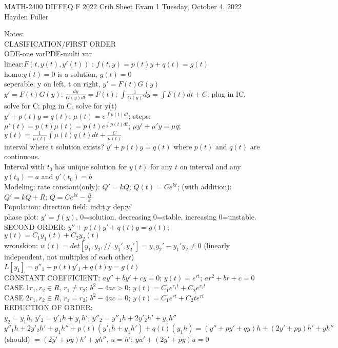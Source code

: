 \documentclass{article}
\begin{document}
MATH-2400 DIFFEQ F 2022 Crib Sheet Exam 1 Tuesday, October 4, 2022 Hayden Fuller
\begin{large}
\noindent Notes:
\\CLASIFICATION/FIRST ORDER
\\ODE-one var\qquad PDE-multi var
\\linear:$F(t,y(t),y'(t))$ : $f(t,y)=p(t)y+q(t)=g(t)$
\\homo:$y(t)=0$ is a solution,  $g(t)=0$
\\seperable: y on left, t on right, $y'=F(t)G(y)$
\\$y'=F(t)G(y)$; $\frac{dy}{G(y)dt}=F(t)$; $\int\frac{1}{G(y)}dy=\int F(t)dt+C$; plug in IC, solve for C; plug in C, solve for y(t)
\\$y'+p(t)y=q(t)$; $\mu(t)=e^{\int p(t)dt}$; steps:$\mu'(t)=p(t)\mu(t)=p(t)e^{\int p(t)dt}$; $\mu y'+\mu'y=\mu q$; 
\\$y(t)=\frac{1}{\mu(t)}\int\mu(t)q(t)dt+\frac{C}{\mu(t)}$
\\interval where t solution exists? $y'+p(t)y=q(t)$ where $p(t)$ and $q(t)$ are continuous. 
\\Interval with $t_0$ has unique solution for $y(t)$ for any $t$ on interval and any $y(t_0)=a$ and $y'(t_0)=b$
\\Modeling: rate constant(only): $Q'=kQ$; $Q(t)=Ce^{kt}$; (with addition): $Q'=kQ+R$; $Q=Ce^{kt}-\frac{R}{k}$
\\Population: direction field: ind:t,y dep:y'
\\phase plot: $y'=f(y)$, 0=solution, decreasing 0=stable, increasing 0=unstable.
\\SECOND ORDER: $y''+p(t)y'+q(t)y=g(t)$; $y(t)=C_1y_1(t)+C_2y_2(t)$
\\wronskion: $w(t)=det[y_1,y_2,//,y_1',y_2']=y_1y_2'-y_1'y_2\ne0$ (linearly independent, not multiples of each other)
\\$L[y_1]=y''_1+p(t)y'_1+q(t)y=g(t)$
\\CONSTANT COEFFICIENT: $ay''+by'+cy=0$; $y(t)=e^{rt}$; $ar^2+br+c=0$
\\CASE 1$r_1,r_2\in R$, $r_1\ne r_2$; $b^2-4ac>0$; $y(t)=C_1e^{r_1t}+C_2e^{r_2t}$
\\CASE 2$r_1,r_2\in R$, $r_1=r_2$; $b^2-4ac=0$; $y(t)=C_1e^{rt}+C_2te^{rt}$
\\REDUCTION OF ORDER:
\\$y_2=y_1h$, $y'_2=y'_1h+y_1h'$, $y''_2=y''_1h+2y'_2h'+y_1h''$
\\$y''_1h+2y'_2h'+y_1h''+p(t)(y'_1h+y_1h')+q(t)(y_1h)=(y''+py'+qy)h+(2y'+py)h'+yh''$ (should) $=(2y'+py)h'+yh''$, $u=h'$; $yu'+(2y'+py)u=0$

\end{large}
\end{document}
